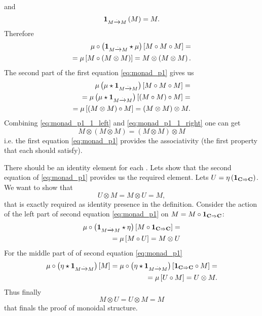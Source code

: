 and
\[
\mathbf{1}_{ M \xrightarrow{.} M }\left(M\right) = M.
\]
Therefore
\begin{eqnarray}
\mu \circ \left( \mathbf{1}_{ M \xrightarrow{.} M } \star \mu \right) \left[ M \circ M \circ M
\right] = 
\nonumber \\
=
\mu \left[M \circ \left(M \otimes M\right)\right] = 
M \otimes \left(M \otimes M\right).
\label{eq:monad_p1_1_left}
\end{eqnarray}
The second part of the first equation \eqref{eq:monad_p1} gives us
\begin{eqnarray}
\mu \left( \mu \star \mathbf{1}_{ M \xrightarrow{.} M } \right) \left[ M \circ M \circ M
\right] = 
\nonumber \\
=
\mu \left( \mu \star \mathbf{1}_{ M \xrightarrow{.} M } \right) \left[ \left(M \circ M\right)
  \circ M \right] = 
\nonumber \\
= \mu \left[\left(M \otimes M\right) \circ M \right] = 
\left(M \otimes M\right) \otimes M. 
\label{eq:monad_p1_1_right}
\end{eqnarray}
Combining \eqref{eq:monad_p1_1_left} and \eqref{eq:monad_p1_1_right}
one can get
\[
M \otimes \left(M \otimes M\right) = 
\left(M \otimes M\right) \otimes M
\]
i.e. the first equation \eqref{eq:monad_p1} provides the associativity
(the first property that each  should satisfy). 

There should be an identity element for each .
Lets show that the second equation of  \eqref{eq:monad_p1} provides us
the required element. Lets $U =
\eta\left(\mathbf{1}_{ \mathbf{C} \Rightarrow \mathbf{C} }\right)$. 
We want to show that 
\begin{equation}
U \otimes M = M \otimes U = M, 
\nonumber
\end{equation}
that is exactly required as identity presence in the
 definition.
Consider the action of the left part of second equation
\eqref{eq:monad_p1} on $M = M \circ \mathbf{1}_{ \mathbf{C} \Rightarrow \mathbf{C} }$:
\begin{eqnarray}
\mu \circ \left( \mathbf{1}_{ M \xrightarrow{.} M } \star \eta \right) \left[M \circ \mathbf{1}_{ \mathbf{C} \Rightarrow \mathbf{C} }\right] = 
\nonumber \\
=
\mu \left[M \circ U\right] = M \otimes U
\nonumber
\end{eqnarray}
For the middle part of  of second equation
\eqref{eq:monad_p1}
\begin{eqnarray}
\mu \circ \left( \eta \star \mathbf{1}_{ M \xrightarrow{.} M } \right) \left[M\right] = 
\mu \circ \left( \eta \star \mathbf{1}_{ M \xrightarrow{.} M } \right) \left[\mathbf{1}_{ \mathbf{C} \Rightarrow \mathbf{C} } \circ M\right] = 
\nonumber \\
=
\mu \left[U \circ M\right] = U \otimes M.
\nonumber
\end{eqnarray}
Thus
finally
\[
M \otimes U = U \otimes M = M
\]
that finals the proof of monoidal structure.

